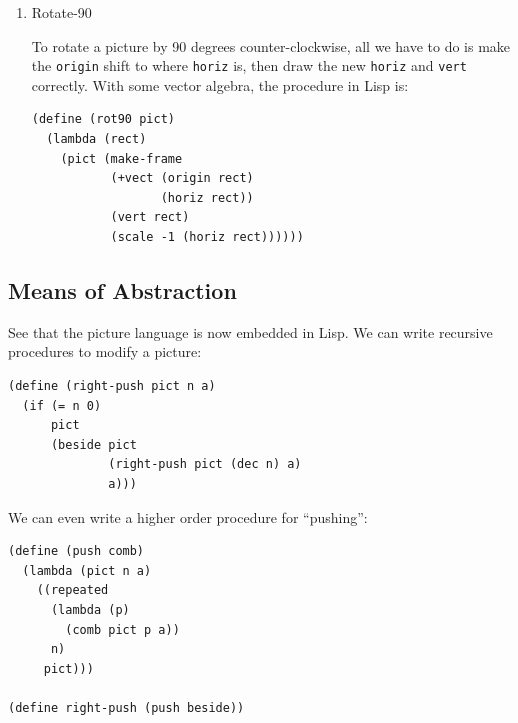 \documentclass[9pt]{report}
\begin{document}
\begin{enumerate}
\begin{verbatim}
(define (beside p1 p2 a)
  (lambda (rect)
    (p1 (make-frame
         (origin rect)
         (scale a (horiz rect))
         (vert rect)))
    (p2 (make-frame
         (+vect (origin rect)
                (scale a (horiz rect)))
         (scale (-1 a) (horiz rect))
         (vert rect)))))
\end{verbatim}

\item Rotate-90
\label{sec:org7998224}

To rotate a picture by 90 degrees counter-clockwise, all we have
to do is make the \texttt{origin} shift to where \texttt{horiz} is, then draw
the new \texttt{horiz} and \texttt{vert} correctly. With some vector algebra,
the procedure in Lisp is:

\begin{verbatim}
(define (rot90 pict)
  (lambda (rect)
    (pict (make-frame
           (+vect (origin rect)
                  (horiz rect))
           (vert rect)
           (scale -1 (horiz rect))))))
\end{verbatim}
\end{enumerate}


\subsection{Means of Abstraction}
\label{sec:org69bf252}
See that the picture language is now embedded in Lisp. We can
write recursive procedures to modify a picture:

\begin{verbatim}
(define (right-push pict n a)
  (if (= n 0)
      pict
      (beside pict
              (right-push pict (dec n) a)
              a)))
\end{verbatim}

We can even write a higher order procedure for ``pushing'':
\begin{verbatim}
(define (push comb)
  (lambda (pict n a)
    ((repeated
      (lambda (p)
        (comb pict p a))
      n)
     pict)))

(define right-push (push beside))
\end{verbatim}
\end{document}

